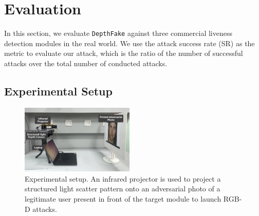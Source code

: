 \section{Evaluation}

In this section, we evaluate \texttt{DepthFake} against three commercial liveness detection modules in the real world. 
We use the attack success rate (SR) as the metric to evaluate our attack, which is the ratio of the number of successful attacks  over the total number of conducted attacks. 


\subsection{Experimental Setup}
\label{sec:experimental}

\begin{figure}[pt]
	\centerline{\includegraphics[width = 0.48\textwidth]{figures/setup.png}}
	\caption{Experimental setup. An infrared projector is used to project a structured light scatter pattern onto an adversarial photo of a legitimate user present in front of the target module to launch RGB-D attacks.}
	\vspace{-0.1in}
	\label{setup}
\end{figure}


\begin{table}[pt]
	\small 
	\caption{Default parameters during evaluation.}
	\vspace{-0.2in}
	\begin{center}
		\label{default_param}
	\end{center}
	\vspace{-0.15in}
\end{table}

